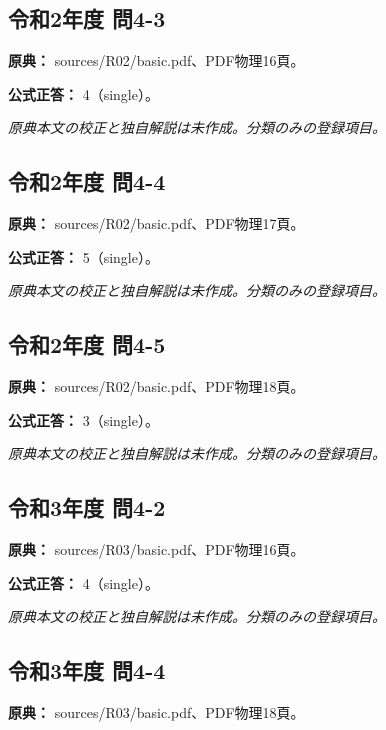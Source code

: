 \subsection{令和2年度 問4-3}
\label{q:r02-reg-basic-4-3}

\noindent\textbf{原典：} sources/R02/basic.pdf、PDF物理16頁。

\textbf{公式正答：} 4（single）。

\par\textit{原典本文の校正と独自解説は未作成。分類のみの登録項目。}

\subsection{令和2年度 問4-4}
\label{q:r02-reg-basic-4-4}

\noindent\textbf{原典：} sources/R02/basic.pdf、PDF物理17頁。

\textbf{公式正答：} 5（single）。

\par\textit{原典本文の校正と独自解説は未作成。分類のみの登録項目。}

\subsection{令和2年度 問4-5}
\label{q:r02-reg-basic-4-5}

\noindent\textbf{原典：} sources/R02/basic.pdf、PDF物理18頁。

\textbf{公式正答：} 3（single）。

\par\textit{原典本文の校正と独自解説は未作成。分類のみの登録項目。}

\subsection{令和3年度 問4-2}
\label{q:r03-reg-basic-4-2}

\noindent\textbf{原典：} sources/R03/basic.pdf、PDF物理16頁。

\textbf{公式正答：} 4（single）。

\par\textit{原典本文の校正と独自解説は未作成。分類のみの登録項目。}

\subsection{令和3年度 問4-4}
\label{q:r03-reg-basic-4-4}

\noindent\textbf{原典：} sources/R03/basic.pdf、PDF物理18頁。

